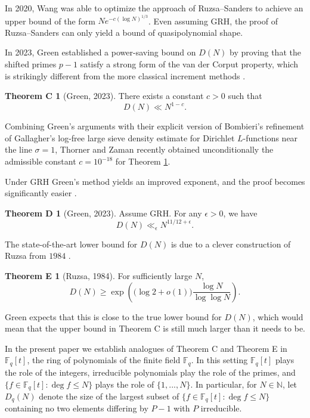 \documentclass{article}
\theoremstyle{definition}
\newtheorem*{thmC}{Theorem C}
\newtheorem*{thmD}{Theorem D}
\newtheorem*{thmE}{Theorem E}
\theoremstyle{definition}
\theoremstyle{remark}
\newcommand{\N}{\mathbb{N}}
\newcommand{\F}{\mathbb{F}_q[t]}
\newcommand{\1}{\mathbf{1}}
\numberwithin{equation}{section}
\begin{document}
In 2020, Wang \cite{Wang2020} was able to optimize the approach of Ruzsa--Sanders to achieve an upper bound of the form $Ne^{-c(\log N)^{1\slash 3}}$. Even assuming GRH, the proof of Ruzsa--Sanders can only yield a bound of quasipolynomial shape. 


In 2023, Green established a power-saving bound on $D(N)$ by proving that the shifted primes $p-1$ satisfy a strong form of the van der Corput property, which is strikingly different from the more classical increment methods \cite{Green23}. 



\begin{thmC}[Green, 2023]\label{GreenUnconditional}
There exists a constant $c>0$ such that 
\[D(N)\ll N^{1-c}.\]
\end{thmC}

Combining Green's arguments with their explicit version of Bombieri’s refinement of Gallagher’s log-free large sieve density estimate for Dirichlet $L$-functions near the line $\sigma=1$, Thorner and Zaman \cite{ThornerZaman2024} recently obtained unconditionally the admissible constant $c=10^{-18}$ for Theorem \ref{GreenUnconditional}.


Under GRH Green’s method yields an improved exponent, and the proof becomes significantly easier \cite{Green}.

\begin{thmD}[Green, 2023]\label{GreenConditional}
Assume GRH. For any $\epsilon>0$, we have 
\[
D(N) \ll_{\epsilon} N^{11/12+\epsilon}.
\]
\end{thmD}


The state-of-the-art lower bound for $D(N)$ is due to a clever construction of Ruzsa from $1984$ \cite{Ruzsa1984}. 

\begin{thmE}[Ruzsa, 1984]\label{lowerbound}
For sufficiently large $N$, 
\[D(N)\geq \exp\left(\big(\log2+o(1)\big)\frac{\log N}{\log \log N}\right).\]
\end{thmE}

Green \cite{Green23} expects that this is close to the true lower bound for $D(N)$, which would mean that the upper bound in Theorem C is still much larger than it needs to be.

In the present paper we establish analogues of Theorem C and Theorem E in $\F$, the ring of polynomials of the finite field $\mathbb{F}_q$. In this setting $\F$ plays the role of the integers, irreducible polynomials play the role of the primes, and $\{f\in \F: \deg f\leq N\}$ plays the role of $\{1,...,N\}$. In particular, for $N\in \N$, let $D_q(N)$ denote the size of the largest subset of $\{f\in \F: \deg f\leq N\}$ containing no two elements differing by $P-1$ with $P$ irreducible.
\end{document}
